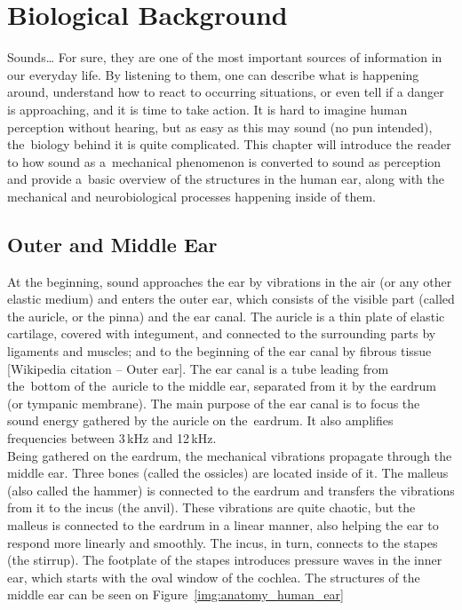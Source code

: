 \chapter{Biological Background}\label{chapter:biology}

Sounds\dots{} For sure, they are one of the most important sources of information in our everyday life. By listening to them, one can describe what is happening around, understand how to react to occurring situations, or even tell if a danger is approaching, and it is time to take action. It is hard to imagine human perception without hearing, but as easy as this may sound (no pun intended), the~biology behind it is quite complicated. This chapter will introduce the reader to how sound as a~mechanical phenomenon is converted to sound as perception and provide a~basic overview of the structures in the human ear, along with the mechanical and neurobiological processes happening inside of them.

\section{Outer and Middle Ear}

At the beginning, sound approaches the ear by vibrations in the air (or any other elastic medium) and enters the outer ear, which consists of the visible part (called the auricle, or the pinna) and the ear canal. The auricle is a thin plate of elastic cartilage, covered with integument, and connected to the surrounding parts by ligaments and muscles; and to the beginning of the ear canal by fibrous tissue [Wikipedia citation – Outer ear]. The ear canal is a tube leading from the~bottom of the~auricle to the middle ear, separated from it by the eardrum (or tympanic membrane). The main purpose of the ear canal is to focus the sound energy gathered by the auricle on the~eardrum. It also amplifies frequencies between 3\,kHz and 12\,kHz.\\

Being gathered on the eardrum, the mechanical vibrations propagate through the middle ear. Three bones (called the ossicles) are located inside of it. The malleus (also called the hammer) is connected to the eardrum and transfers the vibrations from it to the incus (the anvil). These vibrations are quite chaotic, but the malleus is connected to the eardrum in a linear manner, also helping the ear to respond more linearly and smoothly. The incus, in turn, connects to the stapes (the stirrup). The footplate of the stapes introduces pressure waves in the inner ear, which starts with the oval window of the cochlea. The structures of the middle ear can be seen on Figure~\ref{img:anatomy_human_ear}\\

